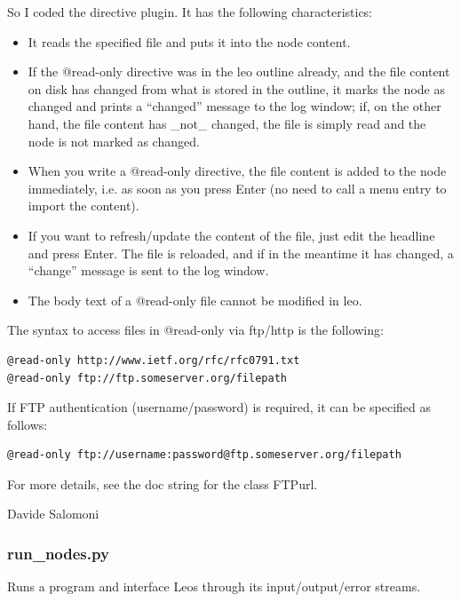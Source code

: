 \documentclass[a4paper,10pt,english]{sphinxmanual}
\begin{document}
So I coded the directive plugin. It has the following characteristics:
\begin{itemize}
\item {} 
It reads the specified file and puts it into the node content.

\item {} 
If the @read-only directive was in the leo outline already, and the file content
on disk has changed from what is stored in the outline, it marks the node as
changed and prints a ``changed'' message to the log window; if, on the other hand,
the file content has \_not\_ changed, the file is simply read and the node is
not marked as changed.

\item {} 
When you write a @read-only directive, the file content is added to the node
immediately, i.e. as soon as you press Enter (no need to call a menu
entry to import the content).

\item {} 
If you want to refresh/update the content of the file, just edit the headline
and press Enter. The file is reloaded, and if in the meantime it has changed,
a ``change'' message is sent to the log window.

\item {} 
The body text of a @read-only file cannot be modified in leo.

\end{itemize}

The syntax to access files in @read-only via ftp/http is the following:

\begin{Verbatim}[commandchars=\\\{\}]
@read-only http://www.ietf.org/rfc/rfc0791.txt
@read-only ftp://ftp.someserver.org/filepath
\end{Verbatim}

If FTP authentication (username/password) is required, it can be specified as follows:

\begin{Verbatim}[commandchars=\\\{\}]
@read-only ftp://username:password@ftp.someserver.org/filepath
\end{Verbatim}

For more details, see the doc string for the class FTPurl.

Davide Salomoni


\subsubsection{run\_nodes.py}
\label{plugins:run-nodes-py}
Runs a program and interface Leos through its input/output/error streams.
\end{document}
